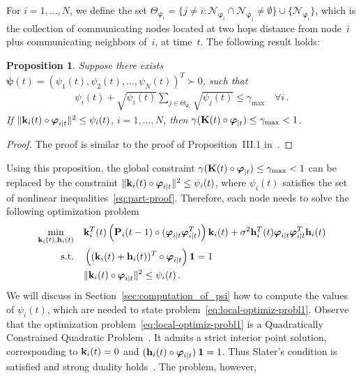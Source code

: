 \documentclass[a4paper,notitlepage,onecolumn]{article}
\def\1{\mathbf{1}}
\def\P{\mathds{P}}
\def\K{{\cal K}}
\def\k{{\bf k}}
\def\h{{\bf h}}
\def\K{{\bf K}}
\def\P{{\bf P}}
\def\psib{\boldsymbol{\psi}}
\def\varphib{\boldsymbol{\varphi}}
\newtheorem{proposition}[theorem]{Proposition}
\numberwithin{equation}{section}
\begin{document}
For $i=1,\dots,N$, we define the set
$\Theta_{\varphib_i}=\{j\neq i : \mathcal{N}_{\varphib_i}
\cap \mathcal{N}_{\varphib_j} \neq \emptyset\} \cup
\{\mathcal{N}_{\varphib_i} \}$, which is the collection of
communicating nodes located at two hops distance from
node~$i$ plus communicating neighbors of~$i$, at time~$t$.
The following result holds:
\begin{proposition}
    Suppose there exists $\psib(t)=(\psi_1(t), \psi_2(t), \ldots, \psi_N(t) )^T \succ 0$, such that
    \begin{align}
        \psi_i(t) + \sqrt{\psi_i(t)} \sum_{j\in
        \Theta_{\varphib_i}}\sqrt{\psi_j(t)}
        \leq \gamma_{\max} \quad \forall i\,. \label{eq:part-proof}
    \end{align}
    If $\|\k_i(t)\circ \varphib_{i|t}\|^2 \leq \psi_i(t)$, $i=1,\dots,N$, then
    ${\gamma}(\K(t)\circ \varphib_{|t}) \leq \gamma_{\max} < 1$.
    \label{prop:gershorin-like}
\end{proposition}
\begin{proof}
The proof is similar to the proof of Proposition~III.1 in~\cite{JSAC07}.
\end{proof}
Using this proposition, the global constraint ${\gamma}(\K(t) \circ \varphib_{|t})\leq \gamma_{\max} <1$ can be replaced by the constraint $\|\k_i(t) \circ \varphib_{i|t}\|^2 \leq
\psi_i(t)$, where $\psi_i(t)$ satisfies the set of nonlinear
inequalities~\eqref{eq:part-proof}. Therefore, each node needs to
solve the following optimization problem
\begin{align}
    \min_{\k_i(t),\h_i(t)} \quad & \k_i^T(t) \left(\P_i(t-1) \circ
    (\varphib_{i|t} \varphib_{i|t}^T)\right)
    \k_i(t)+\sigma^2 \h_i^T(t) \varphib_{i|t} \varphib_{i|t}^T \h_i(t) \label{eq:local-optimiz-probl1}\\
    \text{s.t.}\quad & \left((\k_i(t)+\h_i(t))^T \circ \varphib_{i|t}\right)\1=1\nonumber\\
    &\|\k_i(t) \circ \varphib_{i|t}\|^2 \leq \psi_i(t)\nonumber\,.
\end{align}
We will discuss in Section~\ref{sec:computation_of_psi} how to
compute the values of $\psi_i(t)$, which are needed to state
problem~\eqref{eq:local-optimiz-probl1}. Observe that the
optimization problem~\eqref{eq:local-optimiz-probl1} is a
Quadratically Constrained Quadratic
Problem~\cite[pag.~653]{boyd2}. It admits a strict interior point
solution, corresponding to $\k_i(t)=0$ and $(\h_i(t) \circ
\varphib_{i|t})\:\1=1$. Thus Slater's condition is satisfied and
strong duality holds~\cite[pag.~226]{boyd2}. The problem, however,
\end{document}
